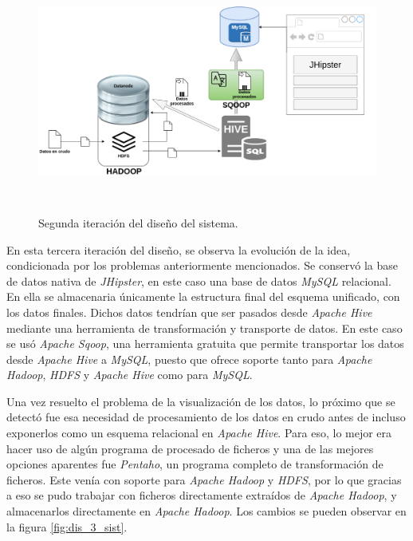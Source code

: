 \begin{figure}[H]
    \centering
    \includegraphics[width=1\textwidth,height=8cm]{Imagenes/Dis_Fig_2}
    \caption{Segunda iteración del diseño del sistema.}
    \label{fig:dis_2_sist}
\end{figure}
\par


En esta tercera iteración del diseño, se observa la evolución de la idea, condicionada por los problemas anteriormente mencionados. Se conservó la base de datos nativa de \textit{JHipster}, en este caso una base de datos \textit{MySQL} relacional. En ella se almacenaria únicamente la estructura final del esquema unificado, con los datos finales. Dichos datos tendrían que ser pasados desde \textit{Apache Hive} mediante una herramienta de transformación y transporte de datos. En este caso se usó \textit{Apache Sqoop}, una herramienta gratuita que permite transportar los datos desde \textit{Apache Hive} a \textit{MySQL}, puesto que ofrece soporte tanto para \textit{Apache Hadoop}, \textit{HDFS} y \textit{Apache Hive} como para \textit{MySQL}. \par
Una vez resuelto el problema de la visualización de los datos, lo próximo que se detectó fue esa necesidad de procesamiento de los datos en crudo antes de incluso exponerlos como un esquema relacional en \textit{Apache Hive}. Para eso, lo mejor era hacer uso de algún programa de procesado de ficheros y una de las mejores opciones aparentes fue \textit{Pentaho}, un programa completo de transformación de ficheros. Este venía con soporte para \textit{Apache Hadoop} y \textit{HDFS}, por lo que gracias a eso se pudo trabajar con ficheros directamente extraídos de \textit{Apache Hadoop}, y almacenarlos directamente en \textit{Apache Hadoop}. Los cambios se pueden observar en la figura \ref{fig:dis_3_sist}. \par


